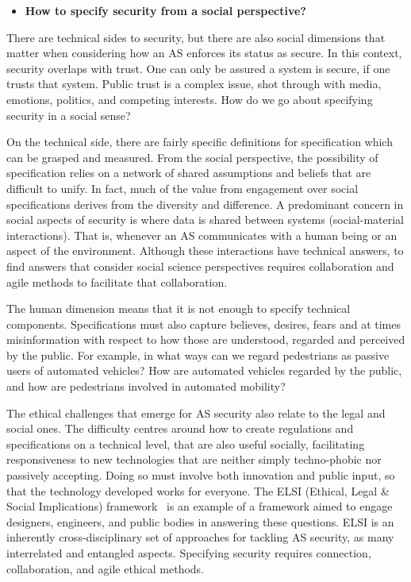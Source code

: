 \documentclass[sigconf,nonacm]{acmart}%
\begin{document}
	\begin{itemize}[leftmargin=0.5cm]
		\item \noindent\textbf{How to specify security from a social perspective?} 
	\end{itemize}
	There are technical sides to security, but there are also social dimensions that matter when considering how an AS enforces its status as secure. In this context, security overlaps with trust. One can only be assured a system is secure, if one trusts that system. Public trust is a complex issue, shot through with media, emotions, politics, and competing interests. How do we go about specifying security in a social sense? 
	
	On the technical side, there are fairly specific definitions for specification which can be grasped and measured. From the social perspective, the possibility of specification relies on a network of shared assumptions and beliefs that are difficult to unify. In fact, much of the value from engagement over social specifications derives from the diversity and difference. 
	A predominant concern in social aspects of security is where data is shared between systems (social-material interactions).
	That is, whenever an AS communicates with a human being or an aspect of the environment. 
	Although these interactions have technical answers, to find answers that consider social science perspectives requires collaboration and agile methods to facilitate that collaboration.
	
	The human dimension means that it is not enough to specify technical components. Specifications must also capture believes, desires, fears and at times misinformation with respect to how those are understood, regarded and perceived by the public. For example, in what ways can we regard pedestrians as passive users of automated vehicles? How are automated vehicles regarded by the public, and how are pedestrians involved in automated mobility?
	
	The ethical challenges that emerge for AS security also relate to the legal and social ones. 
	The difficulty centres around how to create regulations and specifications on a technical level, that are also useful socially, facilitating responsiveness to new technologies that are neither simply techno-phobic nor passively accepting. 
	Doing so must involve both innovation and public input, so that the technology developed works for everyone. The ELSI (Ethical, Legal \& Social Implications) framework~\cite{Escalante2019} is an example of a framework aimed to engage designers, engineers, and public bodies in answering these questions. ELSI is an inherently cross-disciplinary set of approaches for tackling AS security, as many interrelated and entangled aspects. Specifying security requires connection, collaboration, and agile ethical methods.
	
\end{document}
